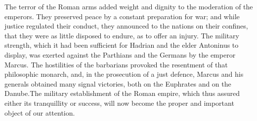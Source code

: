 

The terror of the Roman arms added weight and dignity to the
moderation of the emperors. They preserved peace by a constant
preparation for war; and while justice regulated their conduct,
they announced to the nations on their confines, that they were
as little disposed to endure, as to offer an injury. The military
strength, which it had been sufficient for Hadrian and the elder
Antoninus to display, was exerted against the Parthians and the
Germans by the emperor Marcus. The hostilities of the barbarians
provoked the resentment of that philosophic monarch, and, in the
prosecution of a just defence, Marcus and his generals obtained
many signal victories, both on the Euphrates and on the Danube.\footnotemark[29]
The military establishment of the Roman empire, which thus
assured either its tranquillity or success, will now become the
proper and important object of our attention.


